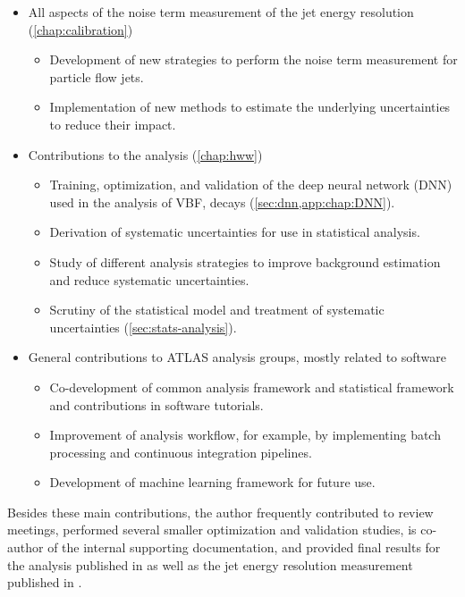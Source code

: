 \begin{itemize}
    \item All aspects of the noise term measurement of the jet energy resolution (\cref{chap:calibration})
          \begin{itemize}
              \item Development of new strategies to perform the noise term measurement for particle flow jets.
              \item Implementation of new methods to estimate the underlying uncertainties to reduce their impact.
          \end{itemize}
    \item Contributions to the \HWW analysis (\cref{chap:hww})
          \begin{itemize}
              \item Training, optimization, and validation of the deep neural network (DNN) used in the analysis of VBF, \HWW decays (\cref{sec:dnn,app:chap:DNN}).
              \item Derivation of systematic uncertainties for use in statistical analysis.
              \item Study of different analysis strategies to improve background estimation and reduce systematic uncertainties.
              \item Scrutiny of the statistical model and treatment of systematic uncertainties (\cref{sec:stats-analysis}).
          \end{itemize}
    \item General contributions to ATLAS analysis groups, mostly related to software
          \begin{itemize}
              \item Co-development of common analysis framework and statistical framework and contributions in software tutorials.
              \item Improvement of analysis workflow, for example, by implementing batch processing and continuous integration pipelines.
              \item Development of machine learning framework for future use.
          \end{itemize}
\end{itemize}
Besides these main contributions, the author frequently contributed to review meetings, performed several smaller optimization and validation studies, is co-author of the internal supporting documentation, and provided final results for the analysis published in  as well as the jet energy resolution measurement published in .


